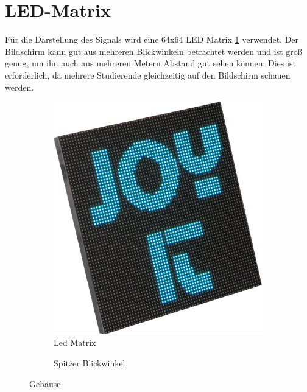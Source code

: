 \section{LED-Matrix}

Für die Darstellung des Signals wird eine 64x64 LED Matrix \ref{fig:led_matrix} verwendet. Der Bildschirm kann gut aus mehreren Blickwinkeln betrachtet werden und ist groß genug, um ihn auch aus mehreren Metern Abstand gut sehen können. Dies ist erforderlich, da mehrere Studierende gleichzeitig auf den Bildschirm schauen werden.

\begin{figure}[H]
	\centering
	\begin{subfigure}{.32\textwidth}
		\centering
		\includegraphics[width=\linewidth]{Pictures/LedMatrix}
		\caption{Led Matrix\cite[S.1]{JoyItLedMatrix}}
	\end{subfigure}	
	\begin{subfigure}{.32\textwidth}
		\centering
		\caption{Spitzer Blickwinkel}
	\end{subfigure}	
	\caption{Gehäuse}
	\label{fig:led_matrix}
\end{figure}


